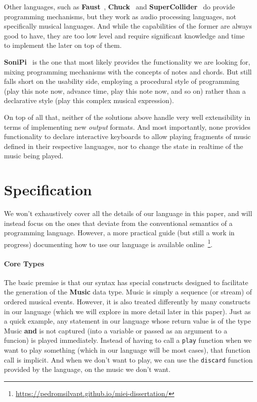 \documentclass[a4paper,UKenglish,cleveref, autoref]{oasics-v2019}
\begin{document}
Other languages, such as \textbf{Faust}~\cite{orlarey:Faust}, \textbf{Chuck}~\cite{doi:Chuck} and \textbf{SuperCollider}~\cite{doi:SuperCollider} do provide programming mechanisms, but they work as audio processing languages, not specifically musical languages. And while the capabilities of the former are always good to have, they are too low level and require significant knowledge and time to implement the later on top of them.

\textbf{SoniPi}~\cite{doi:SonicPi} is the one that most likely provides the functionality we are looking for, mixing programming mechanisms with the concepts of notes and chords. But still falls short on the usability side, employing a procedural style of programming (play this note now, advance time, play this note now, and so on) rather than a declarative style (play this complex musical expression).

On top of all that, neither of the solutions above handle very well extensibility in terms of implementing new \textit{output} formats. And most importantly, none provides functionality to declare interactive keyboards to allow playing fragments of music defined in their respective languages, nor to change the state in realtime of the music being played.

\section{Specification}
We won't exhaustively cover all the details of our language in this paper, and will instead focus on the ones that deviate from the conventional semantics of a programming language. However, a more practical guide (but still a work in progress) documenting how to use our language is available online~\footnote{\url{https://pedromsilvapt.github.io/miei-dissertation/}}.

\paragraph*{Core Types}
The basic premise is that our syntax has special constructs designed to facilitate the generation of the \textbf{Music} data type. Music is simply a sequence (or stream) of ordered musical events. However, it is also treated differently by many constructs in our language (which we will explore in more detail later in this paper). Just as a quick example, any statement in our language whose return value is of the type Music \textbf{and} is not captured (into a variable or passed as an argument to a funcion) is played immediately. Instead of having to call a \texttt{play} function when we want to play something (which in our language will be most cases), that function call is implicit. And when we don't want to play, we can use the \texttt{discard} function provided by the language, on the music we don't want.
\end{document}

